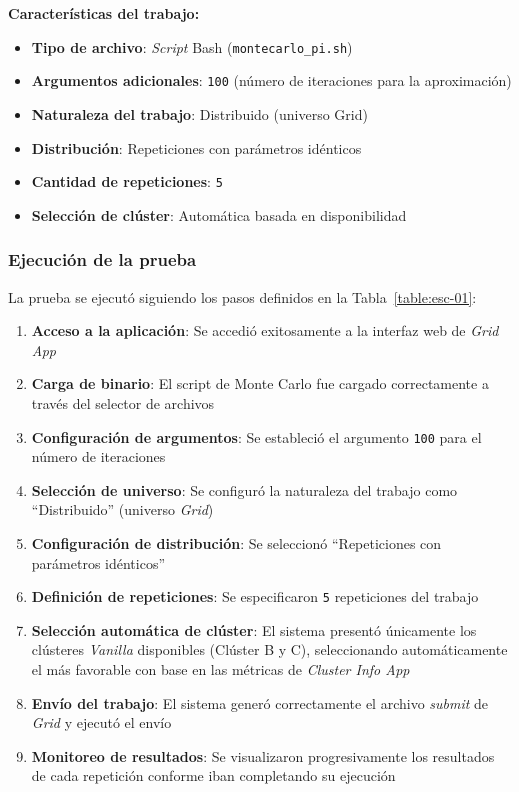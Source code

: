 \textbf{Características del trabajo:}
\begin{itemize}
	\item \textbf{Tipo de archivo}: \textit{Script} Bash (\texttt{montecarlo\_pi.sh})
	\item \textbf{Argumentos adicionales}: \texttt{100} (número de iteraciones para la aproximación)
	\item \textbf{Naturaleza del trabajo}: Distribuido (universo Grid)
	\item \textbf{Distribución}: Repeticiones con parámetros idénticos
	\item \textbf{Cantidad de repeticiones}: \texttt{5}
	\item \textbf{Selección de clúster}: Automática basada en disponibilidad
\end{itemize}

\subsubsection{Ejecución de la prueba}
\noindent

La prueba se ejecutó siguiendo los pasos definidos en la Tabla~\ref{table:esc-01}:

\begin{enumerate}
	\item \textbf{Acceso a la aplicación}: Se accedió exitosamente a la interfaz web de \textit{Grid App}

	\item \textbf{Carga de binario}: El script de Monte Carlo fue cargado correctamente a través del selector de archivos

	\item \textbf{Configuración de argumentos}: Se estableció el argumento \texttt{100} para el número de iteraciones

	\item \textbf{Selección de universo}: Se configuró la naturaleza del trabajo como ``Distribuido'' (universo \textit{Grid})

	\item \textbf{Configuración de distribución}: Se seleccionó ``Repeticiones con parámetros idénticos''

	\item \textbf{Definición de repeticiones}: Se especificaron \texttt{5} repeticiones del trabajo

	\item \textbf{Selección automática de clúster}: El sistema presentó únicamente los clústeres \textit{Vanilla} disponibles (Clúster B y C), seleccionando automáticamente el más favorable con base en las métricas de \textit{Cluster Info App}

	\item \textbf{Envío del trabajo}: El sistema generó correctamente el archivo \textit{submit} de \textit{Grid} y ejecutó el envío

	\item \textbf{Monitoreo de resultados}: Se visualizaron progresivamente los resultados de cada repetición conforme iban completando su ejecución
\end{enumerate}

